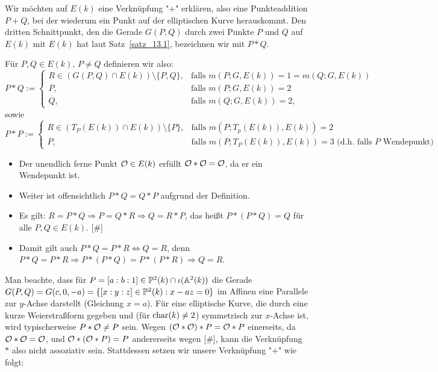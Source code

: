 Wir möchten auf $E(k)$ eine Verknüpfung "$+$" erklären, also eine Punkteaddition $P + Q$, bei der wiederum ein Punkt auf der elliptischen Kurve herauskommt. 
Den dritten Schnittpunkt, den die Gerade $G(P,Q)$ durch zwei Punkte $P$ und $Q$ auf $E(k)$ mit $E(k)$ hat laut Satz~\ref{satz_13.1}, bezeichnen wir mit $P * Q$.

\begin{defn}
\label{def_13.4}
	Für $P,Q \in E(k)$, $P \neq Q$ definieren wir also:
	\[ P * Q := \begin{cases}
		R \in (G(P,Q) \cap E(k)) \setminus \{P,Q\}, & \text{falls } m(P;G,E(k)) = 1 = m(Q;G,E(k)) \\
		P, & \text{falls } m(P;G,E(k)) = 2 \\
		Q, & \text{falls } m(Q;G,E(k)) = 2,
	\end{cases} \]
	sowie
	\[ P * P := \begin{cases}
		R \in (T_P(E(k)) \cap E(k)) \setminus \{P\}, & \text{falls } m(P;T_p(E(k)),E(k)) = 2 \\
		P, & \text{falls } m(P;T_P(E(k)),E(k)) = 3 \text{ (d.h. falls } P \text{ Wendepunkt)}
	\end{cases} \]
\end{defn}

\begin{bem}
	\begin{itemize}
		\item Der unendlich ferne Punkt $\mathcal{O} \in E(k)$ erfüllt $\mathcal{O} * \mathcal{O} = \mathcal{O}$, da er ein Wendepunkt ist.
		\item Weiter ist offensichtlich $P * Q = Q * P$ aufgrund der Definition.
		\item Es gilt: $R = P * Q \Rightarrow P = Q * R \Rightarrow Q = R * P$, das heißt $P * (P * Q) = Q$ für alle $P,Q \in E(k)$. \hfill [\#]
		\item Damit gilt auch $P * Q = P * R \Leftrightarrow Q = R$, denn $P * Q = P * R \Rightarrow P*(P*Q)=P*(P*R) \Rightarrow Q=R$.
	\end{itemize}
\end{bem}

\begin{bem}
	Man beachte, dass für $P = [a:b:1] \in \mathbb{P}^2(k) \cap \iota(\mathbb{A}^2(k))$ die Gerade $G(P,Q) = G(c,0,-a) = \{ [x:y:z] \in \mathbb{P}^2(k) : x - az = 0\}$ im Affinen eine Parallele zur $y$-Achse darstellt (Gleichung $x = a$). 
	Für eine elliptische Kurve, die durch eine kurze Weierstraßform gegeben und (für $\operatorname{char}(k) \neq 2$) symmetrisch zur $x$-Achse ist, wird typischerweise $P * \mathcal{O} \neq P$ sein. 
	Wegen $(\mathcal{O} * \mathcal{O}) * P = \mathcal{O} * P$ einerseits, da $\mathcal{O} * \mathcal{O} = \mathcal{O}$, und $\mathcal{O} * (\mathcal{O} * P) = P$ andererseits wegen [\#], kann die Verknüpfung $*$ also nicht assoziativ sein. 
	Stattdessen setzen wir unsere Verknüpfung "$+$" wie folgt:
\end{bem}

